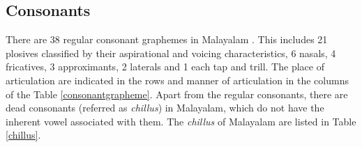 \documentclass{ieeeaccess}
\begin{document}

\subsection{Consonants}

There are 38 regular consonant graphemes in Malayalam \cite{asher1997}. This includes 21 plosives classified by their aspirational and voicing characteristics, 6 nasals, 4 fricatives, 3 approximants, 2 laterals and 1 each tap and trill. The place of articulation are indicated in the rows and manner of articulation in the columns of the Table \ref{consonantgrapheme}. Apart from the regular consonants, there are dead consonants (referred as \textit{chillus}) in Malayalam, which do not have the inherent vowel associated with them. The \textit{chillus} of Malayalam are listed in Table \ref{chillus}. 
\end{document}
